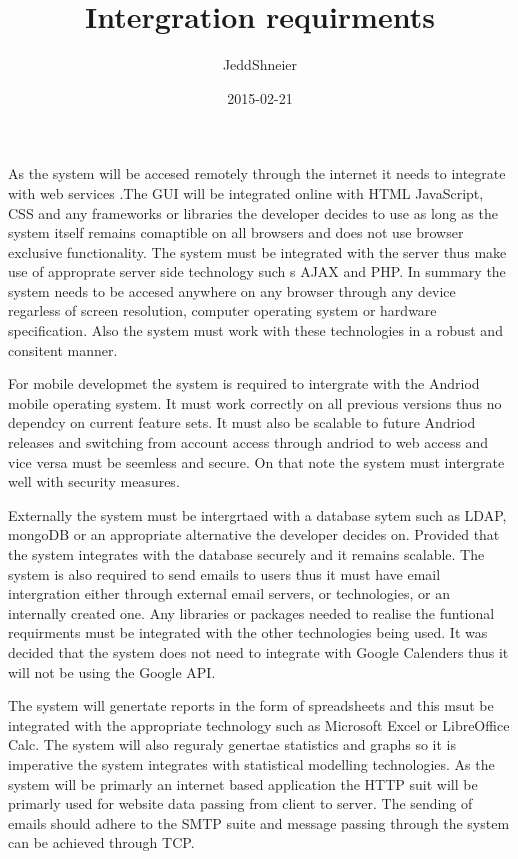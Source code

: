 \documentclass{article}
\title{Intergration requirments}
\date{2015-02-21}
\author{JeddShneier}
\begin{document}
\maketitle
\newpage
{}
As the system will be accesed remotely through the internet it  needs to integrate with web services .The GUI will be integrated online with HTML JavaScript, CSS and any frameworks or libraries the developer decides to use as long as the system itself remains comaptible on all browsers and does not use browser exclusive  functionality. The system must be integrated with the server thus make use of approprate server side technology such s AJAX and PHP. In summary the system needs to be accesed anywhere on any browser through any device regarless of screen resolution, computer operating system or hardware specification. Also the system must work with these technologies in a robust and consitent manner. 
\newline

For mobile developmet the system is required to intergrate with the Andriod mobile operating system. It must work correctly on all previous versions thus no dependcy on current feature sets. It must also be scalable to future Andriod releases and switching from account access through andriod to web access and vice versa must be seemless and secure. On that note the system must intergrate well with security measures.
\newline

Externally the system must be intergrtaed with a database sytem such as LDAP, mongoDB or an appropriate alternative the developer decides on. Provided that the system integrates with the database securely and it remains scalable. The system is also required to send emails to users thus it must have email intergration either through external email servers, or technologies, or an internally created one. Any libraries or packages needed to realise the funtional requirments must be integrated with the other technologies being used.  It was decided that the system does not need to integrate with Google Calenders thus it will not be using the Google API. 
\newline

The system will genertate reports in the form of spreadsheets and this msut be integrated with the appropriate technology such as Microsoft Excel or LibreOffice Calc. The system will also reguraly genertae statistics and graphs so it is imperative the system integrates with statistical modelling technologies. As the system will be primarly an internet based application the  HTTP suit will be primarly used for website data passing from client to server. The sending of emails should adhere to the SMTP suite and message passing through the system can be achieved through TCP. 
\newline
\end{document}
